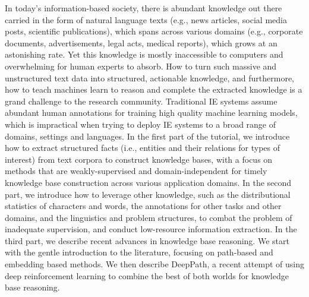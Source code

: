 In today's information-based society, there is abundant knowledge out there carried in the form of natural language texts (e.g., news articles, social media posts, scientific publications), which spans across various domains (e.g., corporate documents, advertisements, legal acts, medical reports), which grows at an astonishing rate. Yet this knowledge is mostly inaccessible to computers and overwhelming for human experts to absorb. How to turn such massive and unstructured text data into structured, actionable knowledge, and furthermore, how to teach machines learn to reason and complete the extracted knowledge is a grand challenge to the research community. Traditional IE systems assume abundant human annotations for training high quality machine learning models, which is impractical when trying to deploy IE systems to a broad range of domains, settings and languages. In the first part of the tutorial, we introduce how to extract structured facts (i.e., entities and their relations for types of interest) from text corpora to construct knowledge bases, with a focus on methods that are weakly-supervised and domain-independent for timely knowledge base construction across various application domains. In the second part, we introduce how to leverage other knowledge, such as the distributional statistics of characters and words, the annotations for other tasks and other domains, and the linguistics and problem structures, to combat the problem of inadequate supervision, and conduct low-resource information extraction. In the third part, we describe recent advances in knowledge base reasoning. We start with the gentle introduction to the literature, focusing on path-based and embedding based methods. We then describe DeepPath, a recent attempt of using deep reinforcement learning to combine the best of both worlds for knowledge base reasoning.
